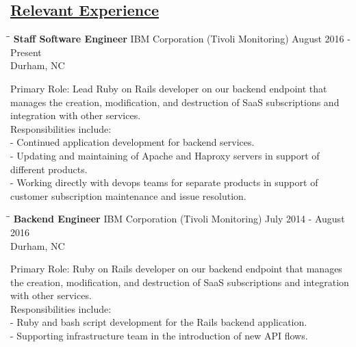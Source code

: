 \documentclass[8pt]{res}
\begin{document}
\begin{resume}
    \section{\underline{Relevant Experience}}
    \vspace{-0.08in}	
    \begin{tabbing}
      \hspace{2.3in}\= \hspace{2.6in}\= \kill %
      \textbf{Staff Software Engineer} \>IBM Corporation (Tivoli Monitoring) \>August 2016 - Present\\ \>Durham, NC
    \end{tabbing}\vspace{-20pt}      %
    Primary Role: Lead Ruby on Rails developer on our backend endpoint that manages the creation, modification, and destruction of SaaS subscriptions and integration with other services.\\
    Responsibilities include:\\
    - Continued application development for backend services.\\
    - Updating and maintaining of Apache and Haproxy servers in support of different products.\\
    - Working directly with devops teams for separate products in support of customer subscription maintenance and issue resolution.
    \begin{tabbing}
      \hspace{2.3in}\= \hspace{2.6in}\= \kill %
      \textbf{Backend Engineer} \>IBM Corporation (Tivoli Monitoring) \>July 2014 - August 2016\\ \>Durham, NC
    \end{tabbing}\vspace{-20pt}      %
    Primary Role: Ruby on Rails developer on our backend endpoint that manages the creation, modification, and destruction of SaaS subscriptions and integration with other services.\\
    Responsibilities include:\\
    - Ruby and bash script development for the Rails backend application.\\
    - Supporting infrastructure team in the introduction of new API flows.\\

\end{resume}
\end{document}

